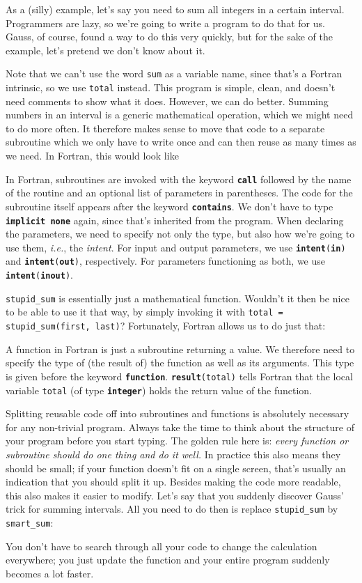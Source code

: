 \documentclass[openany,oneside]{report}
\newcommand{\keyword}[1]{\texttt{\bfseries\color{DarkBlue}#1}}
\begin{document}
As a (silly) example, let's say you need to sum all integers in a certain interval.
Programmers are lazy, so we're going to write a program to do that for us.
Gauss, of course, found a way to do this very quickly, but for the sake of the example, let's pretend we don't know about it.

Note that we can't use the word \texttt{sum} as a variable name, since that's a Fortran intrinsic, so we use \texttt{total} instead.
This program is simple, clean, and doesn't need comments to show what it does.
However, we can do better.
Summing numbers in an interval is a generic mathematical operation, which we might need to do more often.
It therefore makes sense to move that code to a separate subroutine which we only have to write once and can then reuse as many times as we need.
In Fortran, this would look like

In Fortran, subroutines are invoked with the keyword \keyword{call} followed by the name of the routine and an optional list of parameters in parentheses.
The code for the subroutine itself appears after the keyword \keyword{contains}.
We don't have to type \keyword{implicit none} again, since that's inherited from the program.
When declaring the parameters, we need to specify not only the type, but also how we're going to use them, \emph{i.e.}, the \emph{intent}.
For input and output parameters, we use \texttt{\keyword{intent}(\keyword{in})} and \texttt{\keyword{intent}(\keyword{out})}, respectively.
For parameters functioning as both, we use \texttt{\keyword{intent}(\keyword{inout})}.

\texttt{stupid\_sum} is essentially just a mathematical function.
Wouldn't it then be nice to be able to use it that way, by simply invoking it with \texttt{total = stupid\_sum(first, last)}? Fortunately, Fortran allows us to do just that:

A function in Fortran is just a subroutine returning a value.
We therefore need to specify the type of (the result of) the function as well as its arguments.
This type is given before the keyword \keyword{function}.
\texttt{\keyword{result}(total)} tells Fortran that the local variable \texttt{total} (of type \keyword{integer}) holds the return value of the function.

Splitting reusable code off into subroutines and functions is absolutely necessary for any non-trivial program.
Always take the time to think about the structure of your program before you start typing.
The golden rule here is: \emph{every function or subroutine should do one thing and do it well.}
In practice this also means they should be small; if your function doesn't fit on a single screen, that's usually an indication that you should split it up.
Besides making the code more readable, this also makes it easier to modify.
Let's say that you suddenly discover Gauss' trick for summing intervals.
All you need to do then is replace \texttt{stupid\_sum} by \texttt{smart\_sum}:

You don't have to search through all your code to change the calculation everywhere; you just update the function and your entire program suddenly becomes a lot faster.
\end{document}
